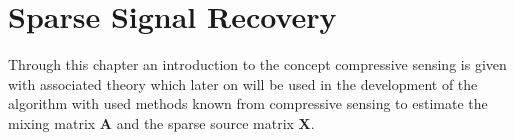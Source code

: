 \chapter{Sparse Signal Recovery}
Through this chapter an introduction to the concept compressive sensing is given with associated theory which later on will be used in the development of the algorithm with used methods known from compressive sensing to estimate the mixing matrix $\mathbf{A}$ and the sparse source matrix $\mathbf{X}$.




